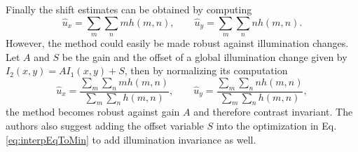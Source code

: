 Finally the shift estimates can be obtained by computing 
\begin{equation}
\hat{u}_x = \sum_m \sum_n m h(m,n), \qquad 
\hat{u}_y = \sum_m \sum_n n h(m,n).
\end{equation}
However, the method could easily be made robust against illumination changes. Let $A$ and $S$ be the gain and the offset of a global illumination change given by $I_2(x,y) = A I_1(x,y) + S$, then by normalizing its computation 
\begin{equation}
\hat{u}_x = \frac{\sum_m \sum_n m h(m,n)}{\sum_m \sum_n h(m,n)}, \qquad 
\hat{u}_y = \frac{\sum_m \sum_n n h(m,n)}{\sum_m \sum_n h(m,n)},
\end{equation}
the method becomes robust against gain $A$ and therefore contrast invariant. The authors also suggest adding the offset variable $S$ into the optimization in Eq. \eqref{eq:interpEqToMin} to add illumination invariance as well.


